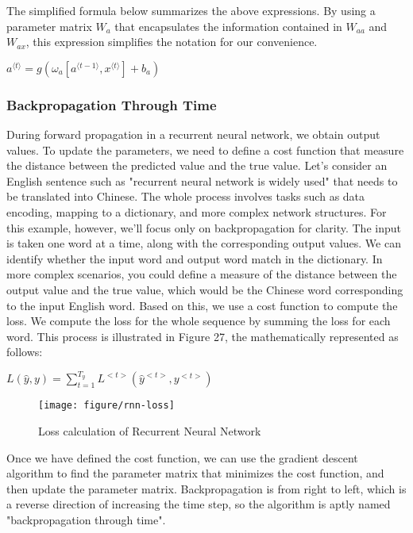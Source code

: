 \documentclass{article}
\begin{document}
The simplified formula below summarizes the above expressions. By using a parameter matrix $W_a$ that encapsulates the information contained in $W_{aa}$ and $W_{ax}$, this expression simplifies the notation for our convenience.

\hspace*{\fill}

$a^{\langle t\rangle}=g\left(\omega_a\left[a^{\langle t-1\rangle}, x^{\langle t\rangle}\right] +b_a\right)$\\


\newpage
\subsubsection{Backpropagation Through Time}

During forward propagation in a recurrent neural network, we obtain output values. To update the parameters, we need to define a cost function that measure the distance between the predicted value and the true value. Let's consider an English sentence such as "recurrent neural network is widely used" that needs to be translated into Chinese. The whole process involves tasks such as data encoding, mapping to a dictionary, and more complex network structures. For this example, however, we'll focus only on backpropagation for clarity. The input is taken one word at a time, along with the corresponding output values.  We can identify whether the input word and output word match in the dictionary. In more complex scenarios, you could define a measure of the distance between the output value and the true value, which would be the Chinese word corresponding to the input English word. Based on this, we use a cost function to compute the loss. We compute the loss for the whole sequence by summing the loss for each word. This process is illustrated in Figure 27, the mathematically represented as follows:


\hspace*{\fill}

$L(\hat{y}, y)=\sum_{t=1}^{T_y} L^{<t>}\left(\hat{y}^{<t>}, y^{<t>}\right)$\\

\begin{figure}[htbp]
        \centering
        \texttt{[image: figure/rnn-loss]}
        \caption{Loss calculation of Recurrent Neural Network}
     \end{figure}

Once we have defined the cost function, we can use the gradient descent algorithm to find the parameter matrix that minimizes the cost function, and then update the parameter matrix. Backpropagation is from right to left, which is a reverse direction of increasing the time step, so the algorithm is aptly named "backpropagation through time". \\
\end{document}
